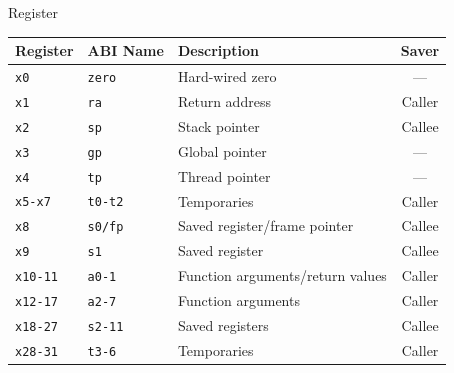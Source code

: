 \begin{frame}[c]{Register}{}
	\begin{center}
		{\rmfamily
			\begin{tabular}{|l|l|l|c|}
				\hline
				Register        & ABI Name       & Description                      & Saver  \\ \hline
				\texttt{x0}     & \texttt{zero}  & Hard-wired zero                  & ---    \\
				\rowcolor{altblue}
				\texttt{x1}     & \texttt{ra}    & Return address                   & Caller \\
				\texttt{x2}     & \texttt{sp}    & Stack pointer                    & Callee \\
				\texttt{x3}     & \texttt{gp}    & Global pointer                   & ---    \\
				\texttt{x4}     & \texttt{tp}    & Thread pointer                   & ---    \\
				\texttt{x5-x7}  & \texttt{t0-t2} & Temporaries                      & Caller \\
				\texttt{x8}     & \texttt{s0/fp} & Saved register/frame pointer     & Callee \\
				\texttt{x9}     & \texttt{s1}    & Saved register                   & Callee \\
				\rowcolor{altyellow}
				\texttt{x10-11} & \texttt{a0-1}  & Function arguments/return values & Caller \\
				\texttt{x12-17} & \texttt{a2-7}  & Function arguments               & Caller \\
				\rowcolor{altmagenta}
				\texttt{x18-27} & \texttt{s2-11} & Saved registers                  & Callee \\
				\rowcolor{altgreen}
				\texttt{x28-31} & \texttt{t3-6}  & Temporaries                      & Caller \\ \hline
			\end{tabular}
		}
	\end{center}
\end{frame}

